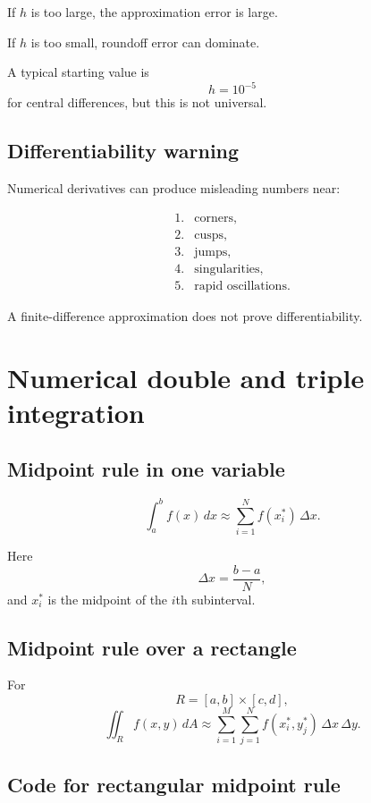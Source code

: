 If \(h\) is too large, the approximation error is large.

If \(h\) is too small, roundoff error can dominate.

A typical starting value is
\[
\boxed{
    h=10^{-5}
}
\]
for central differences, but this is not universal.

\subsection*{Differentiability warning}

Numerical derivatives can produce misleading numbers near:

\[
\begin{array}{ll}
1. & \text{corners,}\\
2. & \text{cusps,}\\
3. & \text{jumps,}\\
4. & \text{singularities,}\\
5. & \text{rapid oscillations.}
\end{array}
\]

A finite-difference approximation does not prove differentiability.

\section{Numerical double and triple integration}
\label{app:G.4}

\subsection*{Midpoint rule in one variable}

\[
\boxed{
    \int_a^b f(x)\,dx
    \approx
    \sum_{i=1}^{N} f(x_i^*)\,\Delta x.
}
\]

Here
\[
    \Delta x=\frac{b-a}{N},
\]
and \(x_i^*\) is the midpoint of the \(i\)th subinterval.

\subsection*{Midpoint rule over a rectangle}

For
\[
    R=[a,b]\times[c,d],
\]
\[
\boxed{
    \iint_R f(x,y)\,dA
    \approx
    \sum_{i=1}^{M}\sum_{j=1}^{N}
    f(x_i^*,y_j^*)\,\Delta x\,\Delta y.
}
\]

\subsection*{Code for rectangular midpoint rule}

